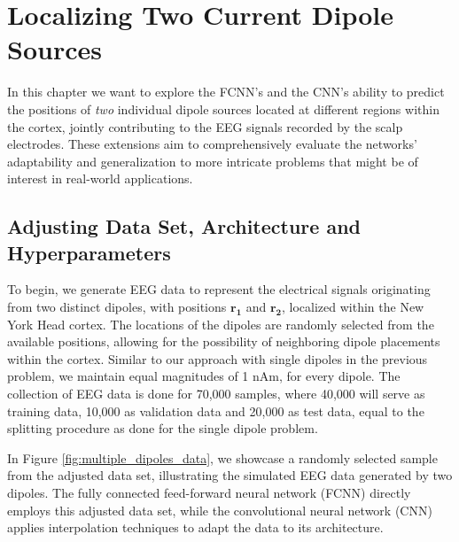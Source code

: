 \documentclass[a4paper, UKenglish, 11pt]{uiomaster}
\begin{document}
\chapter{Localizing Two Current Dipole Sources} \label{chap:two_dipole_FCNN}
In this chapter we want to explore the FCNN's and the CNN's ability to predict the positions of \emph{two} individual dipole sources located at different regions within the cortex, jointly contributing to the EEG signals recorded by the scalp electrodes. These extensions aim to comprehensively evaluate the networks' adaptability and generalization to more intricate problems that might be of interest in real-world applications.


\section{Adjusting Data Set, Architecture and Hyperparameters}
To begin, we generate EEG data to represent the electrical signals originating from two distinct dipoles, with positions $\mathbf{r_1}$ and $\mathbf{r_2}$, localized within the New York Head cortex. The locations of the dipoles are randomly selected from the available positions, allowing for the possibility of neighboring dipole placements within the cortex. Similar to our approach with single dipoles in the previous problem, we maintain equal magnitudes of 1 nAm, for every dipole. The collection of EEG data is done for 70,000 samples, where 40,000 will serve as training data, 10,000 as validation data and 20,000 as test data, equal to the splitting procedure as done for the single dipole problem.

In Figure \ref{fig:multiple_dipoles_data}, we showcase a randomly selected sample from the adjusted data set, illustrating the simulated EEG data generated by two dipoles. The fully connected feed-forward neural network (FCNN) directly employs this adjusted data set, while the convolutional neural network (CNN) applies interpolation techniques to adapt the data to its architecture.
\end{document}

